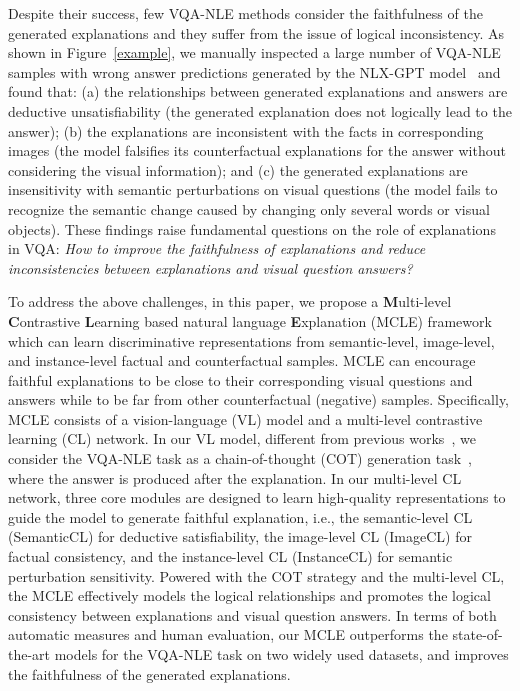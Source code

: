 \documentclass[letterpaper]{article} %
\begin{document}
Despite their success, few VQA-NLE methods consider the faithfulness of the generated explanations and they suffer from the issue of logical inconsistency. As shown in Figure~\ref{example}, we manually inspected a large number of VQA-NLE samples with wrong answer predictions generated by the NLX-GPT model~\cite{sammani2022nlx} and found that: (a) the relationships between generated explanations and answers are deductive unsatisfiability (the generated explanation does not logically lead to the answer); (b) the explanations are inconsistent with the facts in corresponding images (the model falsifies its counterfactual explanations for the answer without considering the visual information); and (c) the generated explanations are insensitivity with semantic perturbations on visual questions (the model fails to recognize the semantic change caused by changing only several words or visual objects). These findings raise fundamental questions on the role of explanations in VQA: {\it How to improve the faithfulness of explanations and reduce inconsistencies between explanations and visual question answers? }

To address the above challenges, in this paper, we propose a \textbf{M}ulti-level \textbf{C}ontrastive \textbf{L}earning based natural language \textbf{E}xplanation (MCLE) framework which can learn discriminative representations from semantic-level, image-level, and instance-level factual and counterfactual samples. MCLE can encourage faithful explanations to be close to their corresponding visual questions and answers while to be far from other counterfactual (negative) samples. Specifically, MCLE consists of a vision-language (VL) model and a multi-level contrastive learning (CL) network. In our VL model, different from previous works~\cite{sammani2022nlx,suo2023s3c}, we consider the VQA-NLE task as a chain-of-thought (COT) generation task~\cite{wei2022chain}, where the answer is produced after the explanation. In our multi-level CL network, three core modules are designed to learn high-quality representations to guide the model to generate faithful explanation, i.e., the semantic-level CL (SemanticCL) for deductive satisfiability, the image-level CL (ImageCL) for factual consistency, and the instance-level CL (InstanceCL) for semantic perturbation sensitivity. Powered with the COT strategy and the multi-level CL, the MCLE effectively models the logical relationships and promotes the logical consistency between explanations and visual question answers. In terms of both automatic measures and human evaluation, our MCLE outperforms the state-of-the-art models for the VQA-NLE task on two widely used datasets, and improves the faithfulness of the generated explanations. 
\end{document}
